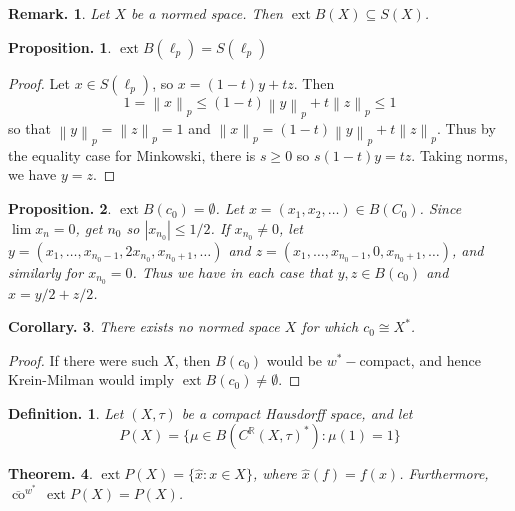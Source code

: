\documentclass[11pt, a4paper]{memoir}
\DeclareMathOperator{\R}{{\mathbb{R}}}
\newcommand{\norm}[1]{\ensuremath{\left\lVert#1\right\rVert}}
\theoremstyle{change}
\newtheorem{theorem}{Theorem.}[section]
\newtheorem{corollary}[theorem]{Corollary.}
\newtheorem{proposition}[theorem]{Proposition.}
\theoremstyle{plain}
\theoremstyle{nonumberplain}
\newtheorem{definition}{Definition.}
\newtheorem{remark}{Remark.}
\newtheorem{proof}{Proof}
\DeclareMathOperator{\ext}{ext}
\newcommand{\cwx}{\ensuremath{\overline{\operatorname{co}}^{w^*}\,}}
\numberwithin{equation}{section}
\begin{document}
\begin{remark}
    Let $X$ be a normed space.
    Then $\ext B(X)\subseteq S(X)$.
\end{remark}
\begin{proposition}
    $\ext B(\ell_p)=S(\ell_p)$
\end{proposition}
\begin{proof}
    Let $x\in S(\ell_p)$, so $x=(1-t)y+tz$.
    Then
    \begin{equation*}
        1=\norm{x}_p\leq(1-t)\norm{y}_p+t\norm{z}_p\leq 1
    \end{equation*}
    so that $\norm{y}_p=\norm{z}_p=1$ and $\norm{x}_p=(1-t)\norm{y}_p+t\norm{z}_p$.
    Thus by the equality case for Minkowski, there is $s\geq 0$ so $s(1-t)y=tz$.
    Taking norms, we have $y=z$.
\end{proof}
\begin{proposition}
    $\ext B(c_0)=\emptyset$.
    Let $x=(x_1,x_2,\ldots)\in B(C_0)$.
    Since $\lim x_n=0$, get $n_0$ so $|x_{n_0}|\leq 1/2$.
    If $x_{n_0}\neq 0$, let $y=(x_1,\ldots,x_{n_0-1},2x_{n_0},x_{n_0+1},\ldots)$ and $z=(x_1,\ldots,x_{n_0-1},0,x_{n_0+1},\ldots)$, and similarly for $x_{n_0}=0$.
    Thus we have in each case that $y,z\in B(c_0)$ and $x=y/2+z/2$.
\end{proposition}
\begin{corollary}
    There exists no normed space $X$ for which $c_0\cong X^*$.
\end{corollary}
\begin{proof}
    If there were such $X$, then $B(c_0)$ would be $w^*-$compact, and hence Krein-Milman would imply $\ext B(c_0)\neq\emptyset$.
\end{proof}
\begin{definition}
    Let $(X,\tau)$ be a compact Hausdorff space, and let
    \begin{equation*}
        P(X)=\{\mu\in B(C^{\R}(X,\tau)^*):\mu(1)=1\}
    \end{equation*}
\end{definition}
\begin{theorem}
    $\ext P(X)=\{\hat x:x\in X\}$, where $\hat x(f)=f(x)$.
    Furthermore, $\cwx\ext P(X)=P(X)$.
\end{theorem}
\end{document}
